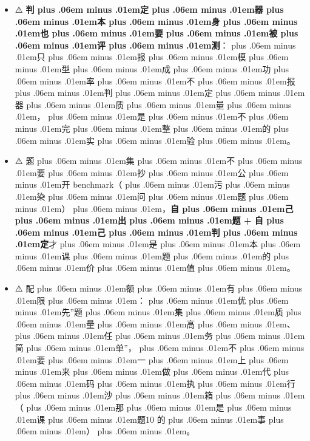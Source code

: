 \documentclass[
]{article}
\providecommand{\tightlist}{%
  \setlength{\itemsep}{0pt}\setlength{\parskip}{0pt}}
\def\zh#1{{\zhfont #1}}
\def\sym#1{{\symfont #1}}
\def\zhglue{\hskip0pt plus .06em minus .01em}
\begin{document}
\begin{itemize}
\tightlist
\item
  \sym{⚠️} \textbf{\zh{判\zhglue 定\zhglue 器\zhglue 本\zhglue 身\zhglue 也\zhglue 要\zhglue 被\zhglue 评\zhglue 测}}\zh{：\zhglue 只\zhglue 报\zhglue 模\zhglue 型\zhglue 成\zhglue 功\zhglue 率\zhglue 不\zhglue 报\zhglue 判\zhglue 定\zhglue 器\zhglue 质\zhglue 量\zhglue ，\zhglue 是\zhglue 不\zhglue 完\zhglue 整\zhglue 的\zhglue 实\zhglue 验\zhglue 。}
\item
  \sym{⚠️} \zh{题\zhglue 集\zhglue 不\zhglue 要\zhglue 抄\zhglue 公\zhglue 开} benchmark\zh{（\zhglue 污\zhglue 染\zhglue 问\zhglue 题\zhglue ）\zhglue ，}\textbf{\zh{自\zhglue 己\zhglue 出\zhglue 题} + \zh{自\zhglue 己\zhglue 判\zhglue 定}}\zh{才\zhglue 是\zhglue 本\zhglue 课\zhglue 题\zhglue 的\zhglue 价\zhglue 值\zhglue 。}
\item
  \sym{⚠️} \zh{配\zhglue 额\zhglue 有\zhglue 限\zhglue ：\zhglue 优\zhglue 先}''\zh{题\zhglue 集\zhglue 质\zhglue 量\zhglue 高\zhglue 、\zhglue 任\zhglue 务\zhglue 简\zhglue 单}''\zh{，\zhglue 不\zhglue 要\zhglue 一\zhglue 上\zhglue 来\zhglue 做\zhglue 代\zhglue 码\zhglue 执\zhglue 行\zhglue 沙\zhglue 箱\zhglue （\zhglue 那\zhglue 是\zhglue 课\zhglue 题}10 \zh{的\zhglue 事\zhglue ）\zhglue 。}
\end{itemize}
\end{document}
